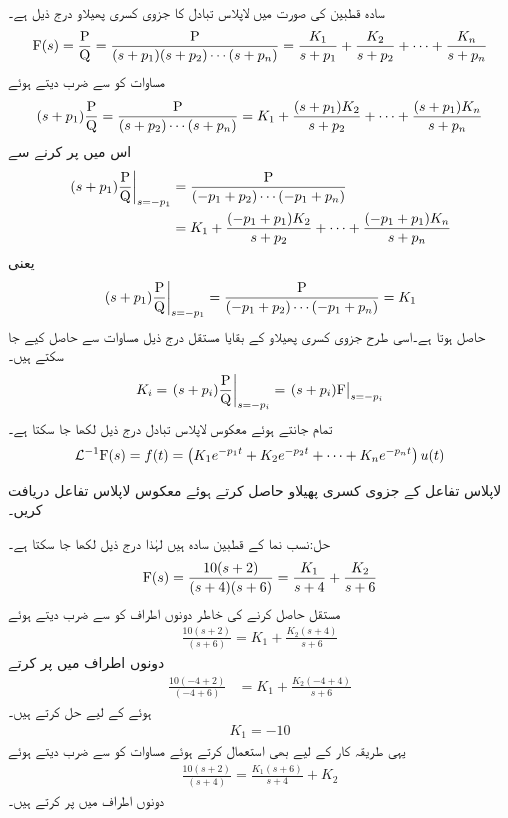 سادہ قطبین کی صورت میں لاپلاس تبادل  کا جزوی کسری پھیلاو درج ذیل ہے۔
\begin{align*}
{\ensuremath{{\textup{F}}}}(s)=\frac{{{\textup{P}}}}{{{\textup{Q}}}}=\frac{{{\textup{P}}}}{(s+p_1)(s+p_2)\cdots(s+p_n)}=\frac{K_1}{s+p_1}+\frac{K_2}{s+p_2}+\cdots +\frac{K_n}{s+p_n}
\end{align*}
مساوات کو  سے ضرب دیتے ہوئے
\begin{align*}
(s+p_1)\frac{{{\textup{P}}}}{{{\textup{Q}}}}=\frac{{{\textup{P}}}}{(s+p_2)\cdots(s+p_n)}=K_1+\frac{(s+p_1)K_2}{s+p_2}+\cdots +\frac{(s+p_1)K_n}{s+p_n}
\end{align*}
اس میں  پر کرنے سے
\begin{align*}
\left. (s+p_1)\frac{{{\textup{P}}}}{{{\textup{Q}}}}\right|_{s=-p_1}&=\frac{{{\textup{P}}}}{(-p_1+p_2)\cdots(-p_1+p_n)}\\
&=K_1+\frac{(-p_1+p_1)K_2}{s+p_2}+\cdots +\frac{(-p_1+p_1)K_n}{s+p_n}
\end{align*}
یعنی
\begin{align*}
\left. (s+p_1)\frac{{{\textup{P}}}}{{{\textup{Q}}}}\right|_{s=-p_1}=\frac{{{\textup{P}}}}{(-p_1+p_2)\cdots(-p_1+p_n)}=K_1
\end{align*}
حاصل ہوتا ہے۔اسی طرح جزوی کسری پھیلاو کے بقایا مستقل درج ذیل مساوات سے حاصل کیے جا سکتے ہیں۔
\begin{align}
K_i=\left. (s+p_i)\frac{{{\textup{P}}}}{{{\textup{Q}}}}\right|_{s=-p_i}=\left. (s+p_i) {{\textup{F}}} \right|_{s=-p_i}
\end{align}
تمام  جانتے ہوئے معکوس لاپلاس تبادل درج ذیل لکھا جا سکتا ہے۔
\begin{align}
\mathcal{L}^{-1} {{\textup{F}}}(s)=f(t)=\left(K_1 e^{-p_1 t}+K_2 e^{-p_2 t}+\cdots+K_n e^{-p_n t}\right) u(t)
\end{align}

لاپلاس تفاعل  کے جزوی کسری پھیلاو حاصل کرتے ہوئے معکوس لاپلاس تفاعل  دریافت کریں۔ 

حل:نسب نما کے قطبین سادہ ہیں لہٰذا درج ذیل لکھا جا سکتا ہے۔
\begin{align}\label{مساوات_لاپلاس_سادہ_قطبین_الف}
{\ensuremath{{\textup{F}}}}(s)=\frac{10(s+2)}{(s+4)(s+6)}=\frac{K_1}{s+4}+\frac{K_2}{s+6}
\end{align}
مستقل  حاصل کرنے کی خاطر دونوں اطراف کو  سے ضرب دیتے ہوئے
\begin{align*}
\frac{10(s+2)}{(s+6)}=K_1+\frac{K_2(s+4)}{s+6}
\end{align*}
دونوں اطراف میں  پر کرتے  
\begin{align*}
\frac{10(-4+2)}{(-4+6)}&=K_1+\frac{K_2(-4+4)}{s+6}
\end{align*}
ہوئے  کے لیے حل کرتے ہیں۔
\begin{align*}
K_1=-10
\end{align*}
یہی طریقہ کار  کے لیے بھی استعمال کرتے ہوئے مساوات  کو  سے ضرب دیتے ہوئے
\begin{align*}
\frac{10(s+2)}{(s+4)}=\frac{K_1(s+6)}{s+4}+K_2
\end{align*}
دونوں اطراف میں  پر کرتے ہیں۔

